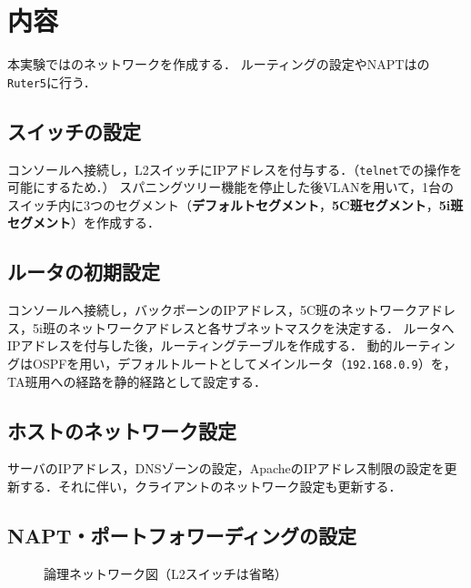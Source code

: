 \section{内容}
本実験ではのネットワークを作成する．
ルーティングの設定やNAPTはの\texttt{Ruter5}に行う．
\subsection{スイッチの設定}
コンソールへ接続し，L2スイッチにIPアドレスを付与する．（\texttt{telnet}での操作を可能にするため．）
スパニングツリー機能を停止した後VLANを用いて，1台のスイッチ内に3つのセグメント（\textbf{デフォルトセグメント}，\textbf{5C班セグメント}，\textbf{5i班セグメント}）を作成する．
\subsection{ルータの初期設定}
コンソールへ接続し，バックボーンのIPアドレス，5C班のネットワークアドレス，5i班のネットワークアドレスと各サブネットマスクを決定する．
ルータへIPアドレスを付与した後，ルーティングテーブルを作成する．
動的ルーティングはOSPFを用い，デフォルトルートとしてメインルータ（\texttt{192.168.0.9}）を，TA班用への経路を静的経路として設定する．
\subsection{ホストのネットワーク設定}
サーバのIPアドレス，DNSゾーンの設定，ApacheのIPアドレス制限の設定を更新する．それに伴い，クライアントのネットワーク設定も更新する．
\subsection{NAPT・ポートフォワーディングの設定}
\begin{figure}
    \centering
    
    \caption{論理ネットワーク図（L2スイッチは省略）}
    \label{fig:ネットワーク図}
\end{figure}
